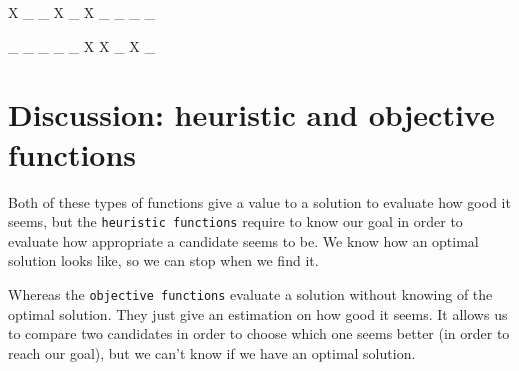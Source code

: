 \documentclass{article}
\begin{document}
X \_ \_ X \_ X \_ \_ \_ \_ 

\_ \_ \_ \_ \_ X X \_ X \_ 


\section{Discussion: heuristic and objective functions}

Both of these types of functions give a value to a solution to evaluate how good
it seems, but the \texttt{heuristic functions} require to know our goal in order
to evaluate how appropriate a candidate seems to be. We know how an optimal solution
looks like, so we can stop when we find it.

Whereas the \texttt{objective functions} evaluate a solution without knowing of
the optimal solution. They just give an estimation on how good it seems. It
allows us to compare two candidates in order to choose which one seems better
(in order to reach our goal), but we can't know if we have an optimal solution.
\end{document}
